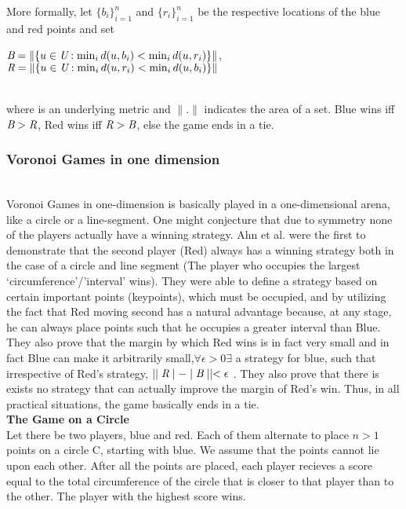 \documentclass[12pt]{article}
\begin{document}
More formally, let $\{b_i\}^n_{i=1}$ and $\{r_i\}^n_{i=1}$ be the respective locations of the blue and red points and set\\


\begin{center}
 $\emph{B} = \|\{u \in \emph{U} : \min_{i} d(u,b_i) < \min_{i} d(u,r_i) \}\|$,\\
$\emph{R} = \|\{u \in \emph{U} : \min_{i} d(u,r_i) < \min_{i} d(u,b_i) \}\|$\\\\

\end{center}
where  is an underlying metric and $\| . \|$ indicates the area of a set. Blue wins iff $\emph{B}>\emph{R}$, Red wins iff $\emph{R}>\emph{B}$, else the game ends in a tie.\\
\newpage
\subsubsection{Voronoi Games in one dimension}\\
\indent \indent Voronoi Games in one-dimension is basically played in a one-dimensional arena, like a circle or a line-segment. One might conjecture that due to symmetry none of the players actually have a winning strategy. Ahn et al. were the first to demonstrate that the second player (Red) always has a winning strategy both in the case of a circle and line segment (The player who occupies the largest ‘circumference’/’interval’ wins). They were able to define a strategy based on certain important points (keypoints), which must be occupied, and by utilizing the fact that Red moving second has a natural advantage because, at any stage, he can always place points such that he occupies a greater interval than Blue.
They also prove that the margin by which Red wins is in fact very small and in fact Blue can make it arbitrarily small,$ \forall \epsilon > 0 \exists$ a strategy for blue, such that irrespective of Red’s strategy,  $\mid\mid\emph{R}\mid-\mid\emph{B}\mid \mid < \epsilon$ . They also prove that there is exists no strategy that can actually improve the margin of Red’s win. Thus, in all practical situations, the game basically ends in a tie.\\

{\bf The Game on a Circle}
\\

Let there be two players, blue and red. Each of them alternate to place $n > 1$ points on a circle C, starting with blue. We assume that the points cannot lie upon each other. After all the points are placed, each player recieves a score equal to the total circumference of the circle that is closer to that player than to the other. The player with the highest score wins.\\
\end{document}
